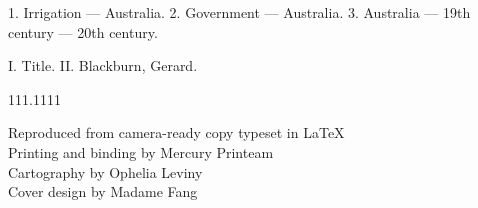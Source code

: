 \documentclass[11pt,b5paper,titlepage]{book}
\newcommand{\clearemptydoublepage}{\newpage{\pagestyle{empty}\cleardoublepage}}
\renewcommand{\headrulewidth}{0pt}%
\begin{document}
\begin{titlepage}
\begin{raggedright}
\begin{list}{}{\setlength{\topsep}{0ex}\setlength{\itemsep}{0ex}\setlength{\leftmargin}{2.5ex}}
\item
1. Irrigation --- Australia. 2. Government --- Australia. 3. Australia
   --- 19th century --- 20th century.

\item
I. Title. II. Blackburn, Gerard.

\end{list}
111.1111

\medskip
Reproduced from camera-ready copy typeset in \LaTeX\\
Printing and binding by Mercury Printeam\\
Cartography by Ophelia Leviny\\
Cover design by Madame Fang

\end{raggedright}
\clearemptydoublepage

\end{titlepage}

\pagestyle{plain}
\begin{spacing}{0.93}
\tableofcontents
\end{spacing}
\newpage


\clearemptydoublepage

\clearemptydoublepage

\mainmatter
\pagestyle{fancy}
\renewcommand{\headrulewidth}{0.4pt}
\fancyhead[LE,RO]{\sffamily \small \thepage}
\fancyfoot{}


\clearemptydoublepage

\clearemptydoublepage

\clearemptydoublepage

\clearemptydoublepage

\clearemptydoublepage

\clearemptydoublepage

\clearemptydoublepage

\clearemptydoublepage

\clearemptydoublepage

\clearemptydoublepage

\clearemptydoublepage

\clearemptydoublepage

\clearemptydoublepage

\clearemptydoublepage

\clearemptydoublepage

\backmatter

\clearemptydoublepage

\clearemptydoublepage

{\small
\printindex
}

\end{document}
